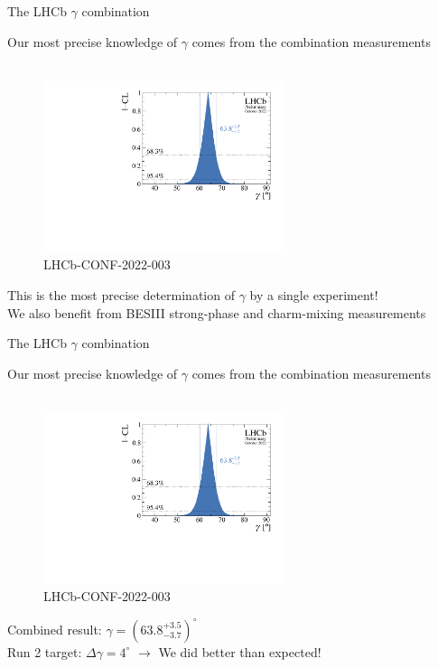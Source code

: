 \documentclass[dvipsnames]{beamer}
\begin{document}
\begin{frame}{The LHCb $\gamma$ combination}
  \begin{center}
    {\Large Our most precise knowledge of $\gamma$ comes from the combination measurements}\\~\\
  \end{center}
  \vspace{-0.5cm}
  \begin{figure}
    \includegraphics[height=5.0cm]{Plots/gammacharm_lhcb_gamma_only.pdf}
    \vspace{-0.5cm}
    \caption*{\tiny LHCb-CONF-2022-003}
  \end{figure}
  \vspace{-0.465cm}
  \begin{center}
    This is the most precise determination of $\gamma$ by a single experiment!\\
    We also benefit from BESIII strong-phase and charm-mixing measurements
  \end{center}
\end{frame}

\begin{frame}{The LHCb $\gamma$ combination}
  \begin{center}
    {\Large Our most precise knowledge of $\gamma$ comes from the combination measurements}\\~\\
  \end{center}
  \vspace{-0.5cm}
  \begin{figure}
    \includegraphics[height=5.0cm]{Plots/gammacharm_lhcb_gamma_only.pdf}
    \vspace{-0.5cm}
    \caption*{\tiny LHCb-CONF-2022-003}
  \end{figure}
  \vspace{-0.62cm}
  \begin{center}
    Combined result: \colorbox{Cerulean!30}{$\gamma = (63.8^{+3.5}_{-3.7})^\circ$}\\
    Run 2 target: $\Delta\gamma = 4^\circ$ $\rightarrow$ We did better than expected!
  \end{center}
\end{frame}
\end{document}
